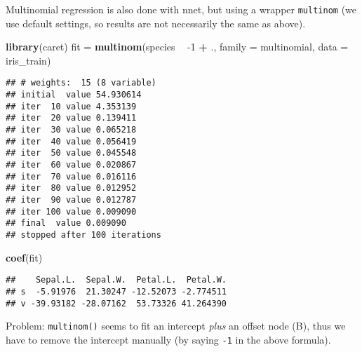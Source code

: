 \documentclass[10pt,ignorenonframetext,]{beamer}
\newenvironment{Shaded}{\begin{snugshade}}{\end{snugshade}}
\newcommand{\DataTypeTok}[1]{\textcolor[rgb]{0.13,0.29,0.53}{#1}}
\newcommand{\DecValTok}[1]{\textcolor[rgb]{0.00,0.00,0.81}{#1}}
\newcommand{\KeywordTok}[1]{\textcolor[rgb]{0.13,0.29,0.53}{\textbf{#1}}}
\newcommand{\NormalTok}[1]{#1}
\newcommand{\OperatorTok}[1]{\textcolor[rgb]{0.81,0.36,0.00}{\textbf{#1}}}
\newcommand{\StringTok}[1]{\textcolor[rgb]{0.31,0.60,0.02}{#1}}
\begin{document}
\begin{frame}[fragile]

Multinomial regression is also done with nnet, but using a wrapper
\texttt{multinom} (we use default settings, so results are not
necessarily the same as above).

\scriptsize

\begin{Shaded}
\begin{Highlighting}[]
\KeywordTok{library}\NormalTok{(caret)}
\NormalTok{fit =}\StringTok{ }\KeywordTok{multinom}\NormalTok{(species }\OperatorTok{~}\StringTok{ }\DecValTok{-1} \OperatorTok{+}\StringTok{ }\NormalTok{., }\DataTypeTok{family =}\NormalTok{ multinomial, }\DataTypeTok{data =}\NormalTok{ iris_train)}
\end{Highlighting}
\end{Shaded}

\begin{verbatim}
## # weights:  15 (8 variable)
## initial  value 54.930614 
## iter  10 value 4.353139
## iter  20 value 0.139411
## iter  30 value 0.065218
## iter  40 value 0.056419
## iter  50 value 0.045548
## iter  60 value 0.020867
## iter  70 value 0.016116
## iter  80 value 0.012952
## iter  90 value 0.012787
## iter 100 value 0.009090
## final  value 0.009090 
## stopped after 100 iterations
\end{verbatim}

\begin{Shaded}
\begin{Highlighting}[]
\KeywordTok{coef}\NormalTok{(fit)}
\end{Highlighting}
\end{Shaded}

\begin{verbatim}
##    Sepal.L.  Sepal.W.  Petal.L.  Petal.W.
## s  -5.91976  21.30247 -12.52073 -2.774511
## v -39.93182 -28.07162  53.73326 41.264390
\end{verbatim}

Problem: \texttt{multinom()} seems to fit an intercept \emph{plus} an
offset node (B), thus we have to remove the intercept manually (by
saying \texttt{-1} in the above formula).

\end{frame}
\end{document}
